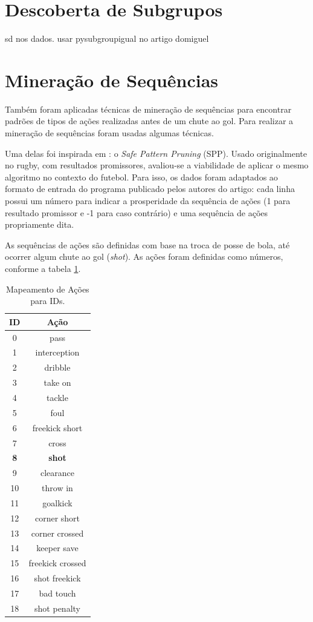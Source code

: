 \documentclass{article}
\begin{document}
\section{Descoberta de Subgrupos}

sd nos dados. usar pysubgroupigual no artigo domiguel

\section{Mineração de Sequências}

Também foram aplicadas técnicas de mineração de sequências para encontrar
padrões de tipos de ações realizadas antes de um chute ao gol. Para realizar a
mineração de sequências foram usadas algumas técnicas. 

Uma delas foi inspirada em \cite{bunker2021supervised}: o \textit{Safe Pattern
Pruning} (SPP). Usado originalmente no rugby, com resultados promissores,
avaliou-se a viabilidade de aplicar o mesmo algoritmo no contexto do futebol.
Para isso, os dados foram adaptados ao formato de entrada do programa publicado
pelos autores do artigo: cada linha possui um número para indicar a prosperidade
da sequência de ações (1 para resultado promissor e -1 para caso contrário) e
uma sequência de ações propriamente dita.

As sequências de ações são definidas com base na troca de posse de bola, até
ocorrer algum chute ao gol (\textit{shot}). As ações foram definidas como números, conforme a
tabela \ref{tab:id_to_action_map}.

\begin{table}[H]
	\centering
	\begin{tabular}{|c|c|}
		\hline
		\textbf{ID}            & \textbf{Ação}
		\\ \hline
		0 & pass
		\\ \hline
		1 & interception
		\\ \hline
		2 & dribble
		\\ \hline
		3 & take on
		\\ \hline
		4 & tackle
		\\ \hline
		5 & foul
		\\ \hline
		6 & freekick short
		\\ \hline
		7 & cross
		\\ \hline
		\textbf{8} & \textbf{shot}
		\\ \hline
		9 & clearance
		\\ \hline
		10 & throw in
		\\ \hline
		11 & goalkick
		\\ \hline
		12 & corner short
		\\ \hline
		13 & corner crossed
		\\ \hline
		14 & keeper save
		\\ \hline
		15 & freekick crossed
		\\ \hline
		16 & shot freekick
		\\ \hline
		17 & bad touch
		\\ \hline
		18 & shot penalty
		\\ \hline
	\end{tabular}
	\caption{Mapeamento de Ações para IDs.}
	\label{tab:id_to_action_map}
\end{table}
\end{document}
